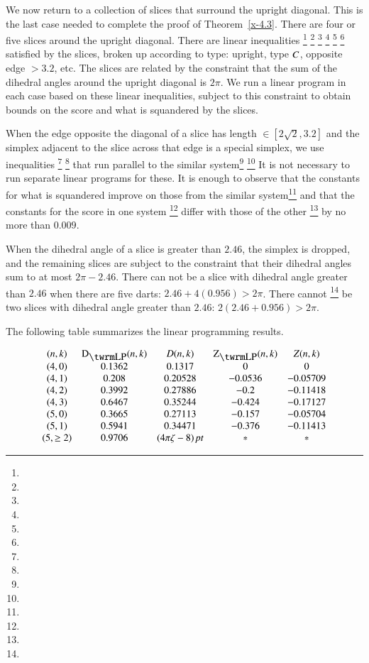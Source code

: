 We now return to a collection of slices that surround
the upright diagonal.  This is the last case needed to complete
the proof of Theorem~\ref{x-4.3}. There are four or five 
slices around the upright diagonal.
There are linear inequalities%
\footnote{} %
\footnote{} %
\footnote{} %
\footnote{} %
\footnote{} %
\footnote{} %
satisfied by the slices, broken
up according to type: upright, type $C$, opposite edge $>3.2$,
etc. The slices are related by the constraint that the
sum of the dihedral angles around the upright diagonal is $2\pi$.
We run a linear program in each case based on these linear
inequalities, subject to this constraint to obtain bounds on the
score and what is squandered by the slices.

When the edge opposite the diagonal of a slice has length
$\in[2\sqrt{2},3.2]$ and the simplex adjacent to the slice
across that edge is a special simplex, we use inequalities%
\footnote{} %
\footnote{} %
that run parallel to the similar system\footnote{} %
\footnote{} %
It is not
necessary to run separate linear programs for these.  It is enough to
observe that the constants for what is squandered improve on those from
the similar system\footnote{} %
and that the constants for the score in one system%
\footnote{} %
differ with those of the other%
\footnote{} %
by no more than $0.009$.

When the dihedral angle of a slice is greater than $2.46$,
the simplex is dropped, and the remaining slices are subject
to the constraint that their dihedral angles sum to at most $2\pi-2.46$.
There can not be a slice with dihedral angle greater than
$2.46$ when there are five darts: $2.46+4 (0.956)>2\pi$. There cannot%
\footnote{} %
be two slices with dihedral angle greater than $2.46$:
$2(2.46+0.956)>2\pi$.

The following table summarizes the linear programming results.

$$
\begin{matrix}
(n,k)   &   \DLP(n,k) & D(n,k)      &\ZLP(n,k)  &Z(n,k)\\
(4,0)   &   0.1362  &   0.1317  &   0   &   0\\
(4,1)   &   0.208   &   0.20528 &-0.0536&   -0.05709\\
(4,2)   &   0.3992  &   0.27886 &-0.2   &   -0.11418\\
(4,3)   &  0.6467   &   0.35244 &-0.424 &   -0.17127\\
(5,0)   &   0.3665  &   0.27113 &-0.157 &   -0.05704\\
(5,1)   &  0.5941   &   0.34471 &-0.376 &   -0.11413\\
(5,\ge2)&  0.9706   &  \squander    &*          &   *
\end{matrix}
$$

